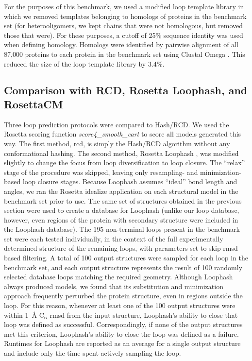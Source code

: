 For the purposes of this benchmark, we used a modified loop template library in which we removed templates belonging to homologs of proteins in the benchmark set (for heterooligomers, we kept chains that were not homologous, but removed those that were). For these purposes, a cutoff of 25\% sequence identity was used when defining homology. Homologs were identified by pairwise alignment of all 87,000 proteins to each protein in the benchmark set using Clustal Omega \citep*{Sievers2011}. This reduced the size of the loop template library by 3.4\%.

\subsection{Comparison with RCD, Rosetta Loophash, and RosettaCM}

Three loop prediction protocols were compared to Hash/RCD. We used the Rosetta scoring function \emph{score4\_smooth\_cart} to score all models generated this way. The first method, \gls{rcd}, is simply the Hash/RCD algorithm without any conformational hashing. The second method, Rosetta Loophash \citep*{Tyka2012}, was modified slightly to change the focus from loop diversification to loop closure. The “relax” stage of the procedure was skipped, leaving only resampling- and minimization-based loop closure stages. Because Loophash assumes “ideal” bond length and angles, we ran the Rosetta idealize application on each structural model in the benchmark set prior to use. The same set of structures obtained in the previous section were used to create a database for Loophash (unlike our loop database, however, even regions of the protein with secondary structure were included in the Loophash database). The 195 non-terminal loops present in the benchmark set were each tested individually, in the context of the full experimentally determined structure of the remaining loops, with parameters set to skip \gls{rmsd}-based filtering. A total of 100 output structures were sampled for each loop in the benchmark set, and each output structure represents the result of 100 randomly selected database loops matching the required geometry. Although Loophash always produced models, we found that its substitution and minimization approach frequently perturbed the protein structure, even in regions outside the loop. For this reason, whenever at least one of the 100 output structures were within \SI{1}{\angstrom} $\mathrm{C_{\upalpha}}$ \gls{rmsd} from the input structure, Loophash's ability to close that loop was defined as successful. Correspondingly, if none of the output structures met this criterion, Loophash's ability to close the loop was defined as a failure. Runtimes for Loophash are reported as an average for a single output structure and include only the time spent actively sampling the loop.

